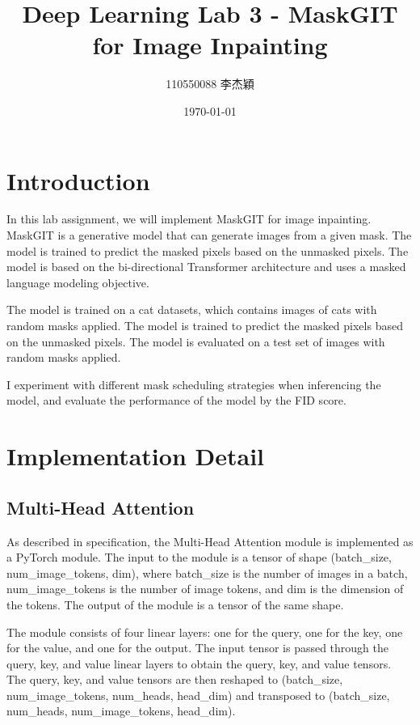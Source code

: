 \documentclass[twocolumn,a4paper]{article}
\title{Deep Learning Lab 3 - MaskGIT for Image Inpainting}
\author{110550088 李杰穎}
\date{\today}
\begin{document}
\maketitle

\section{Introduction}

In this lab assignment, we will implement MaskGIT\cite{chang2022maskgit} for image inpainting. MaskGIT is a generative model that can generate images from a given mask. The model is trained to predict the masked pixels based on the unmasked pixels. The model is based on the bi-directional Transformer\cite{vaswani2017attention} architecture and uses a masked language modeling objective.

The model is trained on a cat datasets, which contains images of cats with random masks applied. The model is trained to predict the masked pixels based on the unmasked pixels. The model is evaluated on a test set of images with random masks applied. 

I experiment with different mask scheduling strategies when inferencing the model, and evaluate the performance of the model by the FID score.

\section{Implementation Detail}
\subsection{Multi-Head Attention}


As described in specification, the Multi-Head Attention module is implemented as a PyTorch module. The input to the module is a tensor of shape (batch\_size, num\_image\_tokens, dim), where batch\_size is the number of images in a batch, num\_image\_tokens is the number of image tokens, and dim is the dimension of the tokens. The output of the module is a tensor of the same shape.

The module consists of four linear layers: one for the query, one for the key, one for the value, and one for the output. The input tensor is passed through the query, key, and value linear layers to obtain the query, key, and value tensors. The query, key, and value tensors are then reshaped to (batch\_size, num\_image\_tokens, num\_heads, head\_dim) and transposed to (batch\_size, num\_heads, num\_image\_tokens, head\_dim).
\end{document}
